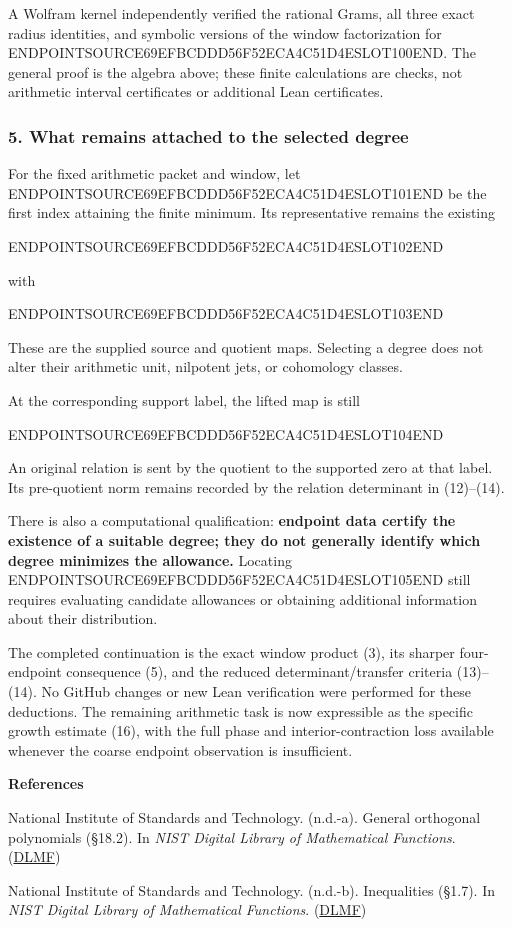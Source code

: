 A Wolfram kernel independently verified the rational Grams, all three exact radius identities, and symbolic versions of the window factorization for ENDPOINTSOURCE69EFBCDDD56F52ECA4C51D4ESLOT100END. The general proof is the algebra above; these finite calculations are checks, not arithmetic interval certificates or additional Lean certificates.

\subsubsection{5. What remains attached to the selected degree}\label{endpoint-user_product_original--what-remains-attached-to-the-selected-degree}

For the fixed arithmetic packet and window, let ENDPOINTSOURCE69EFBCDDD56F52ECA4C51D4ESLOT101END be the first index attaining the finite minimum. Its representative remains the existing

ENDPOINTSOURCE69EFBCDDD56F52ECA4C51D4ESLOT102END

with

ENDPOINTSOURCE69EFBCDDD56F52ECA4C51D4ESLOT103END

These are the supplied source and quotient maps. Selecting a degree does not alter their arithmetic unit, nilpotent jets, or cohomology classes.

At the corresponding support label, the lifted map is still

ENDPOINTSOURCE69EFBCDDD56F52ECA4C51D4ESLOT104END

An original relation is sent by the quotient to the supported zero at that label. Its pre-quotient norm remains recorded by the relation determinant in (12)--(14).

There is also a computational qualification: \textbf{endpoint data certify the existence of a suitable degree; they do not generally identify which degree minimizes the allowance.} Locating ENDPOINTSOURCE69EFBCDDD56F52ECA4C51D4ESLOT105END still requires evaluating candidate allowances or obtaining additional information about their distribution.

The completed continuation is the exact window product (3), its sharper four-endpoint consequence (5), and the reduced determinant/transfer criteria (13)--(14). No GitHub changes or new Lean verification were performed for these deductions. The remaining arithmetic task is now expressible as the specific growth estimate (16), with the full phase and interior-contraction loss available whenever the coarse endpoint observation is insufficient.

\textbf{References}

National Institute of Standards and Technology. (n.d.-a). General orthogonal polynomials (§18.2). In \emph{NIST Digital Library of Mathematical Functions}. (\href{https://dlmf.nist.gov/18.2?utm_source=chatgpt.com}{DLMF})

National Institute of Standards and Technology. (n.d.-b). Inequalities (§1.7). In \emph{NIST Digital Library of Mathematical Functions}. (\href{https://dlmf.nist.gov/1.7?utm_source=chatgpt.com}{DLMF})
